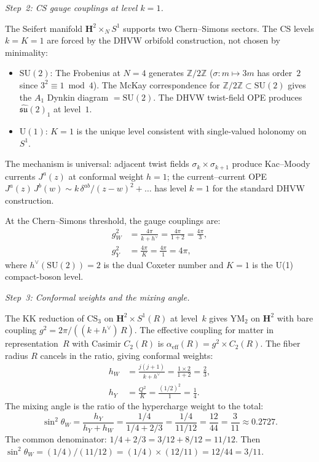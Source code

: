 \medskip\noindent
\emph{Step~2: CS gauge couplings at level $k = 1$.}

The Seifert manifold $\mathbf{H}^2 \times_N S^1$ supports
two Chern--Simons sectors.
The CS levels $k = K = 1$ are forced by the DHVW orbifold construction,
not chosen by minimality:
\begin{itemize}
\item \emph{$\mathrm{SU}(2)$}:
  The Frobenius at $N = 4$ generates
  $\mathbb{Z}/2\mathbb{Z}$ ($\sigma\colon m \mapsto 3m$
  has order~$2$ since $3^2 \equiv 1 \bmod 4$).
  The McKay correspondence for
  $\mathbb{Z}/2\mathbb{Z} \subset \mathrm{SU}(2)$
  gives the $A_1$ Dynkin diagram $= \mathrm{SU}(2)$.
  The DHVW twist-field OPE produces
  $\widehat{\mathfrak{su}}(2)_1$ at level~$1$.

\item \emph{$\mathrm{U}(1)$}:
  $K = 1$ is the unique level consistent with
  single-valued holonomy on~$S^1$.
\end{itemize}
The mechanism is universal: adjacent twist fields
$\sigma_k \times \sigma_{k+1}$ produce Kac--Moody currents
$J^a(z)$ at conformal weight $h = 1$; the current--current OPE
$J^a(z)\,J^b(w) \sim k\,\delta^{ab}/(z - w)^2 + \ldots$
has level $k = 1$ for the standard DHVW construction.

At the Chern--Simons threshold, the gauge couplings are:
\begin{align}
  g_W^2 &= \frac{4\pi}{k + h^\vee}
         = \frac{4\pi}{1 + 2} = \frac{4\pi}{3},
  \label{eq:supp-gw} \\[4pt]
  g_Y^2 &= \frac{4\pi}{K}
         = \frac{4\pi}{1} = 4\pi,
  \label{eq:supp-gy}
\end{align}
where $h^\vee(\mathrm{SU}(2)) = 2$ is the dual Coxeter number
and $K = 1$ is the U(1) compact-boson level.

\medskip\noindent
\emph{Step~3: Conformal weights and the mixing angle.}

The KK reduction of $\mathrm{CS}_3$ on
$\mathbf{H}^2 \times S^1(R)$ at level~$k$ gives
$\mathrm{YM}_2$ on $\mathbf{H}^2$ with bare coupling
$g^2 = 2\pi/((k + h^\vee)\,R)$.
The effective coupling for matter in representation~$R$
with Casimir $C_2(R)$ is
$\alpha_{\mathrm{eff}}(R) = g^2 \times C_2(R)$.
The fiber radius $R$ cancels in the ratio, giving
conformal weights:
\begin{align}
  h_W &= \frac{j(j+1)}{k + h^\vee}
       = \frac{1 \times 2}{1 + 2}
       = \frac{2}{3},
  \label{eq:supp-hw} \\[4pt]
  h_Y &= \frac{Q^2}{K}
       = \frac{(1/2)^2}{1}
       = \frac{1}{4}.
  \label{eq:supp-hy}
\end{align}
The mixing angle is the ratio of the hypercharge weight to the total:
\begin{equation}\label{eq:supp-weinberg-ratio}
  \sin^2\theta_W
  = \frac{h_Y}{h_Y + h_W}
  = \frac{1/4}{1/4 + 2/3}
  = \frac{1/4}{11/12}
  = \frac{12}{44}
  = \frac{3}{11}
  \approx 0.2727.
\end{equation}
The common denominator: $1/4 + 2/3 = 3/12 + 8/12 = 11/12$.
Then $\sin^2\theta_W = (1/4)/(11/12) = (1/4) \times (12/11)
= 12/44 = 3/11$.

